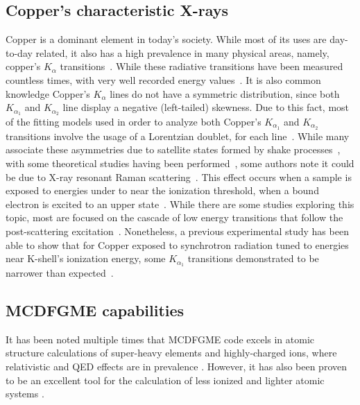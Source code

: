 \subsection{Copper's characteristic X-rays}
Copper is a dominant element in today's society. While most of its uses are day-to-day related, it also has a high prevalence in many physical areas, namely, copper's $K_\alpha$ transitions~\cite{Nguyen2022}. While these radiative transitions have been measured countless times, with very well recorded energy values~\cite{Melia2020,Melia2019,Sorum1987,Bremer1982,Deutsch1995}.
It is also common knowledge Copper's $K_\alpha$ lines do not have a symmetric distribution, since both $K_{\alpha_1}$ and $K_{\alpha_2}$ line display a negative (left-tailed) skewness. Due to this fact, most of the fitting models used in order to analyze both Copper's $K_{\alpha_1}$ and $K_{\alpha_2}$ transitions involve the usage of a Lorentzian doublet, for each line~\cite{Ito2016,Berger1986}.
While many associate these asymmetries due to satellite states formed by shake processes~\cite{Galambosi2003,Nguyen2022}, with some theoretical studies having been performed~\cite{Chantler2009}, some authors note it could be due to X-ray resonant Raman scattering~\cite{Galambosi2003}. This effect occurs when a sample is exposed to energies under to near the ionization threshold, when a bound electron is excited to an upper state~\cite{RamanBook}.
While there are some studies exploring this topic, most are focused on the cascade of low energy transitions that follow the post-scattering excitation~\cite{Carra1995}. Nonetheless, a previous experimental study has been able to show that for Copper exposed to synchrotron radiation tuned to energies near K-shell's ionization energy, some $K_{\alpha_1}$ transitions demonstrated to be narrower than expected~\cite{Eisenberger1976}.








\subsection{MCDFGME capabilities}

It has been noted multiple times that \gls{MCDFGME} code excels in atomic structure calculations of super-heavy elements and highly-charged ions, where relativistic and QED effects are in prevalence \cite{Indelicato2011,Indelicato1987,Gorceix1987}. However, it has also been proven to be an excellent tool for the calculation of less ionized and lighter atomic systems \cite{Guerra2021}.

